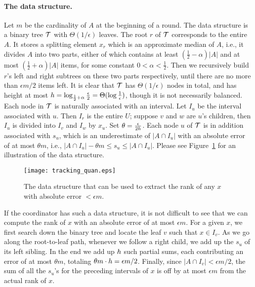 \documentclass[10pt]{article}
\newcommand{\eps}{\epsilon}
\begin{document}
\paragraph{The data structure.}
Let $m$ be the cardinality of $A$ at the beginning of a round. The data
structure is a binary tree $\mathcal{T}$ with $\Theta(1/\eps)$ leaves.  The root $r$
of $\mathcal{T}$ corresponds to the entire $A$.  It stores a splitting element $x_r$
which is an approximate median of $A$, i.e., it divides $A$ into two parts,
either of which contains at least $(\frac{1}{2}- \alpha)|A|$ and at most
$(\frac{1}{2}+\alpha)|A|$ items, for some constant $0<\alpha<\frac{1}{2}$.
Then we recursively build $r$'s left and right subtrees on these two parts
respectively, until there are no more than $\eps m /2$ items left.  It is
clear that $\mathcal{T}$ has $\Theta(1/\eps)$ nodes in total, and has height at most
$\hmax = \log_{\frac{1}{2}+\alpha} \frac{\eps}{2} =
\Theta(\log\frac{1}{\eps})$, though it is not necessarily balanced.  Each
node in $\mathcal{T}$ is naturally associated with an interval.  Let $I_u$ be the
interval associated with $u$.  Then $I_r$ is the entire $U$; suppose $v$
and $w$ are $u$'s children, then $I_u$ is divided into $I_v$ and $I_w$ by
$x_u$.  Set $\theta = \frac{\eps}{2\hmax}$.  Each node $u$ of $\mathcal{T}$ is in
addition associated with $s_u$, which is an underestimate of $|A\cap I_u|$
with an absolute error of at most $\theta m$, i.e., $|A\cap I_u| - \theta m
\le s_u \le |A\cap I_u|$. Please see Figure~\ref{fig:tracking_quan} for an
illustration of the data structure.


\begin{figure}
\begin{center}
\texttt{[image: tracking\_quan.eps]}
\caption{The data structure that can be used to extract the rank of any
$x$ with absolute error $<\epsilon m$.} \label{fig:tracking_quan}
\end{center}
\end{figure}

If the coordinator has such a data structure, it is not difficult to see
that we can compute the rank of $x$ with an absolute error of at most $\eps
m$.  For a given $x$, we first search down the binary tree and locate the
leaf $v$ such that $x \in I_v$.  As we go along the root-to-leaf path,
whenever we follow a right child, we add up the $s_u$ of its left sibling.
In the end we add up $h$ such partial sums, each contributing an error
of at most $\theta m$, totaling $\theta m \cdot \hmax = \eps m /2$.
Finally, since $|A \cap I_v| < \eps m /2$, the sum of all the $s_u$'s for
the preceding intervals of $x$ is off by at most $\eps m$ from the actual
rank of $x$.
\end{document}
